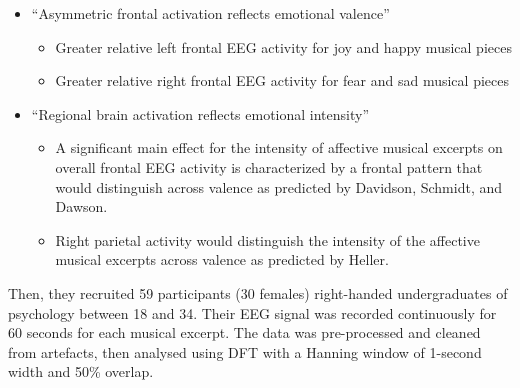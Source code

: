 \begin{itemize}
\item “Asymmetric frontal activation reflects emotional valence”
\begin{itemize}
\item Greater relative left frontal EEG activity for joy and happy musical pieces
\item Greater relative right frontal EEG activity for fear and sad musical pieces
\end{itemize}
\item “Regional brain activation reflects emotional intensity”
\begin{itemize}
\item A significant main effect for the intensity of affective musical excerpts on overall frontal \ac{EEG} activity is characterized by a frontal pattern that would distinguish across valence as predicted by Davidson, Schmidt, and Dawson.
\item Right parietal activity would distinguish the intensity of the affective musical excerpts across valence as predicted by Heller.
\end{itemize}
\end{itemize}
Then, they recruited 59 participants (30 females) right-handed undergraduates of psychology between 18 and 34. Their EEG signal was recorded continuously for 60 seconds for each musical excerpt. The data was pre-processed and cleaned from artefacts, then analysed using \ac{DFT} with a Hanning window of 1-second width and 50\% overlap. 

